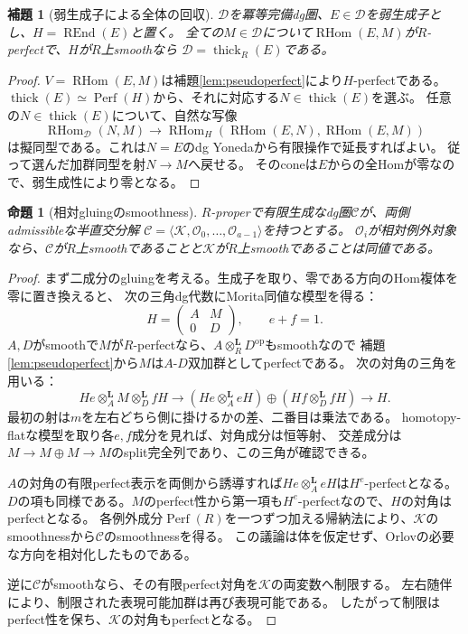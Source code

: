 \documentclass[a4paper,10pt]{ltjsarticle}
\newtheorem{proposition}[theorem]{命題}
\newtheorem{lemma}[theorem]{補題}
\theoremstyle{definition}
\theoremstyle{remark}
\newcommand{\Perf}{\operatorname{Perf}}
\newcommand{\RHom}{\operatorname{RHom}}
\newcommand{\REnd}{\operatorname{REnd}}
\newcommand{\thick}{\operatorname{thick}}
\newcommand{\OO}{\mathcal O}
\newcommand{\cC}{\mathcal C}
\newcommand{\cK}{\mathcal K}
\newcommand{\cD}{\mathcal D}
\newcommand{\otL}{\otimes^{\mathbf L}}
\begin{document}
\begin{lemma}[弱生成子による全体の回収]\label{lem:fullness}
$\cD$を冪等完備dg圏、$E\in\cD$を弱生成子とし、$H=\REnd(E)$と置く。
全ての$M\in\cD$について$\RHom(E,M)$が$R$-perfectで、$H$が$R$上smoothなら
$\cD=\thick_R(E)$である。
\end{lemma}
\begin{proof}
$V=\RHom(E,M)$は補題\ref{lem:pseudoperfect}により$H$-perfectである。
$\thick(E)\simeq\Perf(H)$から、それに対応する$N\in\thick(E)$を選ぶ。
任意の$N\in\thick(E)$について、自然な写像
\[
 \RHom_{\cD}(N,M)\longrightarrow
 \RHom_H(\RHom(E,N),\RHom(E,M))
\]
は擬同型である。これは$N=E$のdg Yonedaから有限操作で延長すればよい。
従って選んだ加群同型を射$N\to M$へ戻せる。
そのconeは$E$からの全Homが零なので、弱生成性により零となる。
\end{proof}

\begin{proposition}[相対gluingのsmoothness]\label{prop:gluing}
$R$-properで有限生成なdg圏$\cC$が、両側admissibleな半直交分解
$\cC=\langle\cK,\OO_0,\ldots,\OO_{a-1}\rangle$を持つとする。
$\OO_i$が相対例外対象なら、$\cC$が$R$上smoothであることと$\cK$が$R$上smoothであることは同値である。
\end{proposition}
\begin{proof}
まず二成分のgluingを考える。生成子を取り、零である方向のHom複体を零に置き換えると、
次の三角dg代数にMorita同値な模型を得る：
\[
 H=\begin{pmatrix}A&M\\0&D\end{pmatrix},\qquad e+f=1.
\]
$A,D$がsmoothで$M$が$R$-perfectなら、$A\otL_RD^{\mathrm{op}}$もsmoothなので
補題\ref{lem:pseudoperfect}から$M$は$A$-$D$双加群としてperfectである。
次の対角の三角を用いる：
\[
 He\otL_A M\otL_D fH\longrightarrow
 (He\otL_A eH)\oplus(Hf\otL_D fH)
 \longrightarrow H.
 \tag{G}\label{eq:gluing-diagonal}
\]
最初の射は$m$を左右どちら側に掛けるかの差、二番目は乗法である。
homotopy-flatな模型を取り各$e,f$成分を見れば、対角成分は恒等射、
交差成分は$M\to M\oplus M\to M$のsplit完全列であり、この三角が確認できる。

$A$の対角の有限perfect表示を両側から誘導すれば$He\otL_A eH$は$H^e$-perfectとなる。
$D$の項も同様である。$M$のperfect性から第一項も$H^e$-perfectなので、$H$の対角はperfectとなる。
各例外成分$\Perf(R)$を一つずつ加える帰納法により、$\cK$のsmoothnessから$\cC$のsmoothnessを得る。
この議論は体を仮定せず、Orlov\cite[Theorem 3.25]{Orlov}の必要な方向を相対化したものである。

逆に$\cC$がsmoothなら、その有限perfect対角を$\cK$の両変数へ制限する。
左右随伴により、制限された表現可能加群は再び表現可能である。
したがって制限はperfect性を保ち、$\cK$の対角もperfectとなる。
\end{proof}
\end{document}
